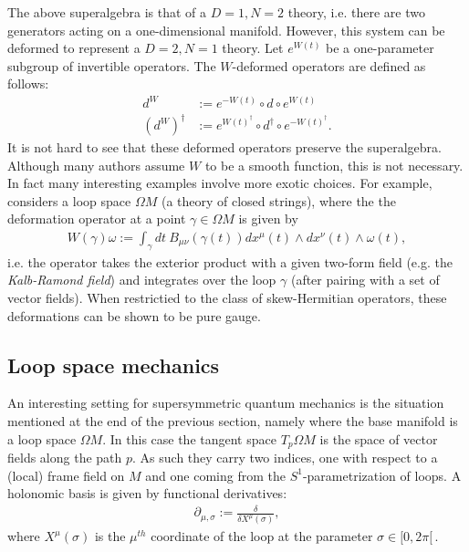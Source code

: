     The above superalgebra is that of a $D=1,N=2$ theory, i.e. there are two generators acting on a one-dimensional manifold. However, this system can be deformed to represent a $D=2,N=1$ theory. Let $e^{W(t)}$ be a one-parameter subgroup of invertible operators. The $W$-deformed operators are defined as follows:
    \begin{align}
        d^W &:= e^{-W(t)}\circ d\circ e^{W(t)}\\
        (d^W)^\dagger &:= e^{W(t)^\dagger}\circ d^\dagger\circ e^{-W(t)^\dagger}.
    \end{align}
    It is not hard to see that these deformed operators preserve the superalgebra. Although many authors assume $W$ to be a smooth function, this is not necessary. In fact many interesting examples involve more exotic choices. For example, \cite{phd_schreiber} considers a loop space $\Omega M$ (a theory of closed strings), where the the deformation operator at a point $\gamma\in\Omega M$ is given by
    \begin{gather}
        W(\gamma)\omega := \int_\gamma dt\ B_{\mu\nu}(\gamma(t))dx^\mu(t)\wedge dx^\nu(t)\wedge\omega(t),
    \end{gather}
    i.e. the operator takes the exterior product with a given two-form field (e.g. the \textit{Kalb-Ramond field}) and integrates over the loop $\gamma$ (after pairing with a set of vector fields). When restrictied to the class of skew-Hermitian operators, these deformations can be shown to be pure gauge.

\subsection{Loop space mechanics}

    An interesting setting for supersymmetric quantum mechanics is the situation mentioned at the end of the previous section, namely where the base manifold is a loop space $\Omega M$. In this case the tangent space $T_p\Omega M$ is the space of vector fields along the path $p$. As such they carry two indices, one with respect to a (local) frame field on $M$ and one coming from the $S^1$-parametrization of loops. A holonomic basis is given by functional derivatives:
    \begin{gather}
        \partial_{\mu,\sigma} := \frac{\delta}{\delta X^\mu(\sigma)},
    \end{gather}
    where $X^\mu(\sigma)$ is the $\mu^{th}$ coordinate of the loop at the parameter $\sigma\in[0,2\pi[\,$.

